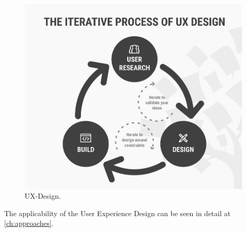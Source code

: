 \begin{figure}[hbt!]
	\centering
	\includegraphics[width=\linewidth]{figures/ux-design}
	\caption{UX-Design.\cite{UXD}}
	\label{fig:ux-design}
\end{figure}

The applicability of the User Experience Design can be seen in detail at \autoref{ch:approaches}. 



\let\cleardoublepage\clearpage
